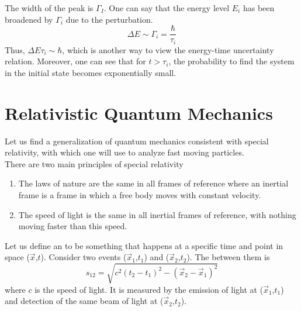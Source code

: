 \documentclass[12pt,a4paper,titlepage]{article}
\newcommand{\ul}[1]{\underline{\smash{#1}}} %
\begin{document}
\begin{center}
\end{center}
The width of the peak is $\Gamma_{I}$. One can say that the energy level $E_{i}$ has been broadened by $\Gamma_{i}$ due to the perturbation.
\begin{equation}
\Delta E\sim\Gamma_{i}=\frac{\hbar}{\tau_{i}}
\end{equation}
Thus, $\Delta E\tau_{i}\sim\hbar$, which is another way to view the energy-time uncertainty relation. Moreover, one can see that for $t>\tau_{i}$, the probability to find the system in the initial state becomes exponentially small.

\newpage
\section{Relativistic Quantum Mechanics}
Let us find a generalization of quantum mechanics consistent with special relativity, with which one will use to analyze fast moving particles.\\

There are two main principles of special relativity
\begin{enumerate}
\item The laws of nature are the same in all frames of reference where an inertial frame is a frame in which a free body moves with constant velocity.
\item The speed of light is the same in all inertial frames of reference, with nothing moving faster than this speed.
\end{enumerate}
Let us define an \ul{event} to be something that happens at a specific time and point in space ($\vec{x}$,$t$). Consider two events ($\vec{x}_{1}$,$t_{1}$) and ($\vec{x}_{2}$,$t_{2}$). The \ul{interval} between them is
\begin{equation}
s_{12}=\sqrt{c^{2}(t_{2}-t_{1})^{2}-(\vec{x}_{2}-\vec{x}_{1})^{2}}
\end{equation}
where $c$ is the speed of light. It is measured by the emission of light at ($\vec{x}_{1}$,$t_{1}$) and detection of the same beam of light at ($\vec{x}_{2}$,$t_{2}$).\\
\end{document}
